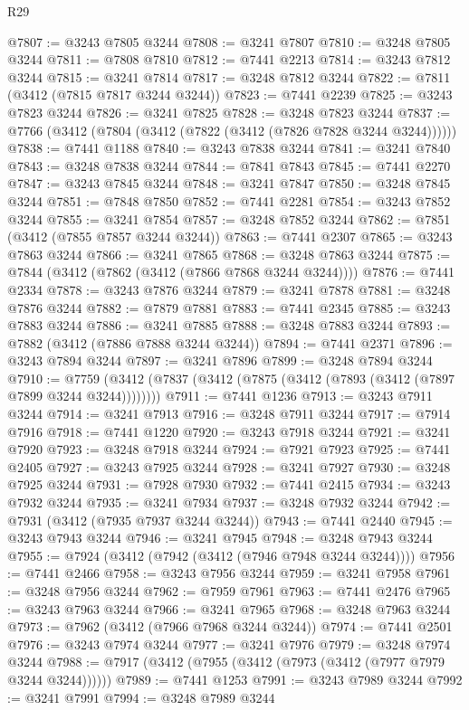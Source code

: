 \begin{lexlean}{R29}
\begin{coremodule}
@7807 := @3243 @7805 @3244
@7808 := @3241 @7807
@7810 := @3248 @7805 @3244
@7811 := @7808 @7810
@7812 := @7441 @2213
@7814 := @3243 @7812 @3244
@7815 := @3241 @7814
@7817 := @3248 @7812 @3244
@7822 := @7811 (@3412 (@7815 @7817 @3244 @3244))
@7823 := @7441 @2239
@7825 := @3243 @7823 @3244
@7826 := @3241 @7825
@7828 := @3248 @7823 @3244
@7837 := @7766 (@3412 (@7804 (@3412 (@7822 (@3412 (@7826 @7828 @3244 @3244))))))
@7838 := @7441 @1188
@7840 := @3243 @7838 @3244
@7841 := @3241 @7840
@7843 := @3248 @7838 @3244
@7844 := @7841 @7843
@7845 := @7441 @2270
@7847 := @3243 @7845 @3244
@7848 := @3241 @7847
@7850 := @3248 @7845 @3244
@7851 := @7848 @7850
@7852 := @7441 @2281
@7854 := @3243 @7852 @3244
@7855 := @3241 @7854
@7857 := @3248 @7852 @3244
@7862 := @7851 (@3412 (@7855 @7857 @3244 @3244))
@7863 := @7441 @2307
@7865 := @3243 @7863 @3244
@7866 := @3241 @7865
@7868 := @3248 @7863 @3244
@7875 := @7844 (@3412 (@7862 (@3412 (@7866 @7868 @3244 @3244))))
@7876 := @7441 @2334
@7878 := @3243 @7876 @3244
@7879 := @3241 @7878
@7881 := @3248 @7876 @3244
@7882 := @7879 @7881
@7883 := @7441 @2345
@7885 := @3243 @7883 @3244
@7886 := @3241 @7885
@7888 := @3248 @7883 @3244
@7893 := @7882 (@3412 (@7886 @7888 @3244 @3244))
@7894 := @7441 @2371
@7896 := @3243 @7894 @3244
@7897 := @3241 @7896
@7899 := @3248 @7894 @3244
@7910 := @7759 (@3412 (@7837 (@3412 (@7875 (@3412 (@7893 (@3412 (@7897 @7899 @3244 @3244))))))))
@7911 := @7441 @1236
@7913 := @3243 @7911 @3244
@7914 := @3241 @7913
@7916 := @3248 @7911 @3244
@7917 := @7914 @7916
@7918 := @7441 @1220
@7920 := @3243 @7918 @3244
@7921 := @3241 @7920
@7923 := @3248 @7918 @3244
@7924 := @7921 @7923
@7925 := @7441 @2405
@7927 := @3243 @7925 @3244
@7928 := @3241 @7927
@7930 := @3248 @7925 @3244
@7931 := @7928 @7930
@7932 := @7441 @2415
@7934 := @3243 @7932 @3244
@7935 := @3241 @7934
@7937 := @3248 @7932 @3244
@7942 := @7931 (@3412 (@7935 @7937 @3244 @3244))
@7943 := @7441 @2440
@7945 := @3243 @7943 @3244
@7946 := @3241 @7945
@7948 := @3248 @7943 @3244
@7955 := @7924 (@3412 (@7942 (@3412 (@7946 @7948 @3244 @3244))))
@7956 := @7441 @2466
@7958 := @3243 @7956 @3244
@7959 := @3241 @7958
@7961 := @3248 @7956 @3244
@7962 := @7959 @7961
@7963 := @7441 @2476
@7965 := @3243 @7963 @3244
@7966 := @3241 @7965
@7968 := @3248 @7963 @3244
@7973 := @7962 (@3412 (@7966 @7968 @3244 @3244))
@7974 := @7441 @2501
@7976 := @3243 @7974 @3244
@7977 := @3241 @7976
@7979 := @3248 @7974 @3244
@7988 := @7917 (@3412 (@7955 (@3412 (@7973 (@3412 (@7977 @7979 @3244 @3244))))))
@7989 := @7441 @1253
@7991 := @3243 @7989 @3244
@7992 := @3241 @7991
@7994 := @3248 @7989 @3244

\end{coremodule}
\end{lexlean}
